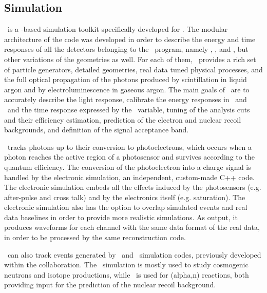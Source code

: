 \subsection{Simulation}
\GFDS\ is a \Geant-based simulation toolkit specifically developed for \DS. The modular architecture of the code was developed in order to describe the energy and time responses of all the detectors belonging to the \DS\ program, namely \DSts, \DSfs, and \DSks, but other variations of the geometries as well. For each of them, \GFDS\ provides a rich set of particle generators, detailed geometries, real data tuned physical processes, and the full optical propagation of the photons produced by scintillation in liquid argon and by electroluminescence in gaseous argon.  The main goals of \GFDS\ are to accurately describe the light response, calibrate the energy responses in \SOne\ and \STwo\ and the time response expressed by the \FNine\ variable, tuning of the analysis cuts and their efficiency estimation, prediction of the electron and nuclear recoil backgrounds, and definition of the signal acceptance band.  

\GFDS\ tracks photons up to their conversion to photoelectrons, which occurs when a photon reaches the active region of a photosensor and survives according to the quantum efficiency. The conversion of the photoelectron into a charge signal is handled by the electronic simulation, an independent, custom-made C++ code. The electronic simulation embeds all the effects induced by the photosensors (e.g. after-pulse and cross talk) and by the electronics itself (e.g. saturation). The electronic simulation also has the option to overlap simulated events and real data baselines in order to provide more realistic simulations.  As output, it produces waveforms for each channel with the same data format of the real data, in order to be processed by the same reconstruction code. 

\GFDS\ can also track events generated by \FLUKA\ and \TALYS\ simulation codes, previously developed within the collaboration.  The \FLUKA\ simulation is mostly used to study cosmogenic neutrons and isotope productions, while \TALYS\ is used for (alpha,n) reactions, both providing input for the prediction of the nuclear recoil background. 